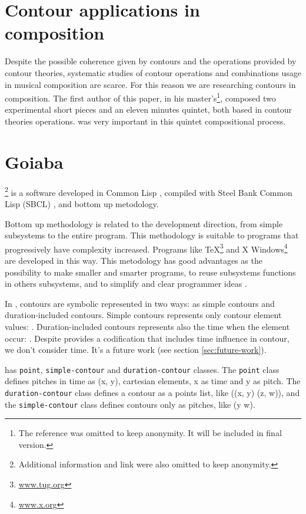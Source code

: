\section{Contour applications in composition}
\label{sec:cont-appl-comp}

Despite the possible coherence given by contours and the operations
provided by contour theories, systematic studies of contour operations
and combinations usage in musical composition are scarce. For this
reason we are researching contours in composition. The first author of
this paper, in his master's\footnote{The reference was omitted to keep
  anonymity. It will be included in final version.}, composed two
experimental short pieces and an eleven minutes quintet, both based in
contour theories operations. \goiaba{} was very important in this
quintet compositional process.

\section{Goiaba}
\label{sec:goiaba}

\goiaba{}\footnote{Additional information and link were also omitted
  to keep anonymity.} is a software developed in Common Lisp
\cite{graham94:lisp}, compiled with Steel Bank Common Lisp (SBCL)
\cite{team07:sbcl}, and bottom up metodology.

Bottom up methodology is related to the development direction, from
simple subsystems to the entire program. This methodology is suitable
to programs that progressively have complexity increased. Programs
like \TeX{}\footnote{\url{www.tug.org}} and X
Windows\footnote{\url{www.x.org}} are developed in this way. This
metodology has good advantages as the possibility to make smaller and
smarter programs, to reuse subsystems functions in others subsystems,
and to simplify and clear programmer ideas \cite{graham94:lisp}.

In \goiaba{}, contours are symbolic represented in two ways: as simple
contours and duration-included contours. Simple contours represents
only contour element values: . Duration-included
contours represents also the time when the element occur: . Despite \goiaba{} provides a codification that
includes time influence in contour, we don't consider time. It's a
future work (see section \ref{sec:future-work}).

\goiaba{} has \texttt{point}, \texttt{simple-contour} and
\texttt{duration-contour} classes. The \texttt{point} class defines
pitches in time as (x, y), cartesian elements, x as time and y as
pitch. The \texttt{duration-contour} class defines a contour as a
points list, like ((x, y) (z, w)), and the \texttt{simple-contour}
class defines contours only as pitches, like (y w).

